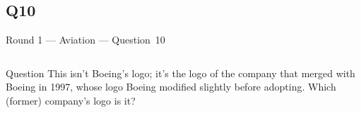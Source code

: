 \documentclass[11pt]{beamer}
\begin{document}
\subsection*{Q10}
\begin{frame}[t]{Round 1 --- Aviation --- \mbox{Question 10}}
    \vspace{-0.5em}
    \begin{columns}[T,totalwidth=\linewidth]
        \begin{column}{0.32\linewidth}
            \begin{block}{Question}
                This isn't Boeing's logo; it's the logo of the company that merged with Boeing in 1997, whose logo Boeing modified slightly before adopting. Which (former) company's logo is it?
            \end{block}
        \end{column}
        \begin{column}{0.65\linewidth}
            \begin{center}
                \texttt{[image: \{Images/mcdonnelldouglas]}.png}
            \end{center}
        \end{column}
    \end{columns}
\end{frame}
\end{document}
